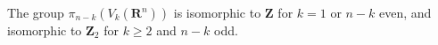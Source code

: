 The group $\pi_{n-k}(V_k(\mathbf{R}^n))$ is isomorphic to $\mathbf{Z}$ for $k = 1$ or $n-k$ even, and isomorphic to $\mathbf{Z}_2$ for $k \geq 2$ and $n-k$ odd.
